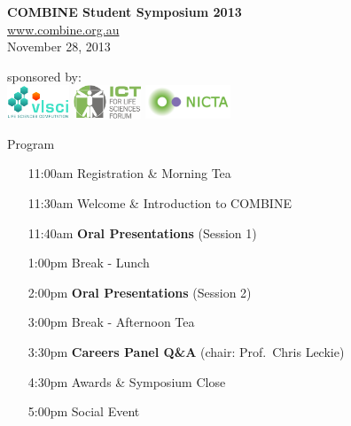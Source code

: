\documentclass[svgnames]{beamer}
\newcommand{\bp}[1]{{\usebeamercolor[fg]{title}#1}}
\begin{document}
\begin{frame}
    \centering
    \vfill
    {\LARGE \bp{\bfseries COMBINE Student Symposium 2013}}\\[1ex]
    \href{http://www.combine.org.au}{\bp{www.combine.org.au}}\\[2ex]
    {November 28, 2013}\\
    \vfill
    \begin{minipage}[c]{\linewidth}
        \centering
        sponsored by:\\
        \includegraphics[height=10mm,valign=T]{./images/logo_vlsci_3508x1890.jpg}
        \qquad
        \includegraphics[height=10mm,valign=T]{./images/ICT-for-Life-Sciences-Forum-logo.png}
        \qquad
        \includegraphics[height=10mm,valign=T]{./images/nicta_logo.png}
    \end{minipage}
\end{frame}

\begin{frame}{Program}
    \centering
    \begin{minipage}[c]{0.8\linewidth}
        \begin{itemize}
            \item[11:00am] Registration \& Morning Tea
            \item[11:30am] Welcome \& Introduction to COMBINE
            \item[11:40am] \textbf{Oral Presentations} (Session 1)
            \item[1:00pm] Break - Lunch
            \item[2:00pm] \textbf{Oral Presentations} (Session 2)
            \item[3:00pm] Break - Afternoon Tea
            \item[3:30pm] \textbf{Careers Panel Q\&A} (chair: Prof.~Chris Leckie)
            \item[4:30pm] Awards \& Symposium Close
            \item[5:00pm] Social Event
        \end{itemize}
    \end{minipage}
\end{frame}
\end{document}
